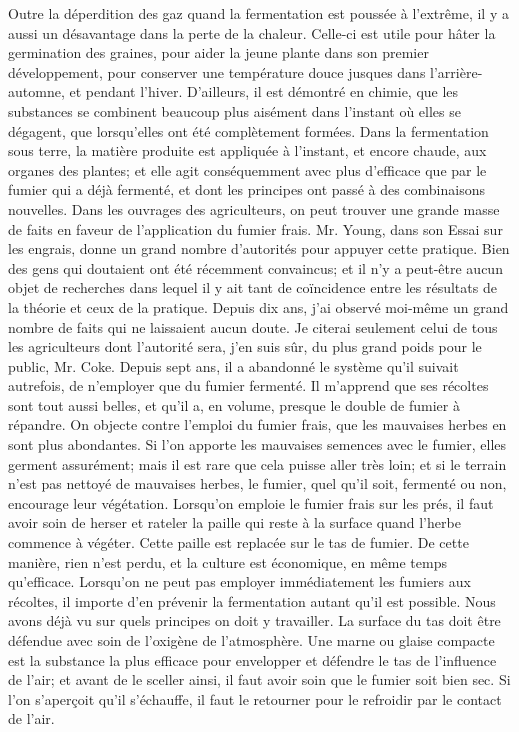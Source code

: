 Outre la déperdition des gaz quand la fermentation est poussée à l'extrême, il y a aussi un désavantage dans la perte de la chaleur. Celle-ci est utile pour hâter la germination des graines, pour aider la jeune plante dans son premier développement, pour conserver une température douce jusques dans l'arrière-automne, et pendant l'hiver.
D'ailleurs, il est démontré en chimie, que les substances se combinent beaucoup plus aisément dans l'instant où elles se dégagent, que lorsqu'elles ont été complètement formées. Dans la fermentation sous terre, la matière produite est appliquée à l'instant, et encore chaude, aux organes des plantes; et elle agit conséquemment avec plus d'efficace que par le fumier qui a déjà fermenté,\setcounter{page}{205} et dont les principes ont passé à des combinaisons nouvelles.
Dans les ouvrages des agriculteurs, on peut trouver une grande masse de faits en faveur de l'application du fumier frais. Mr. Young, dans son Essai sur les engrais, donne un grand nombre d'autorités pour appuyer cette pratique. Bien des gens qui doutaient ont été récemment convaincus; et il n'y a peut-être aucun objet de recherches dans lequel il y ait tant de coïncidence entre les résultats de la théorie et ceux de la pratique. Depuis dix ans, j'ai observé moi-même un grand nombre de faits qui ne laissaient aucun doute. Je citerai seulement celui de tous les agriculteurs dont l'autorité sera, j'en suis sûr, du plus grand poids pour le public, Mr. Coke. Depuis sept ans, il a abandonné le système qu'il suivait autrefois, de n'employer que du fumier fermenté. Il m'apprend que ses récoltes sont tout aussi belles, et qu'il a, en volume, presque le double de fumier à répandre.
On objecte contre l'emploi du fumier frais, que les mauvaises herbes en sont plus abondantes. Si l'on apporte les mauvaises semences avec le fumier, elles germent assurément; mais il est rare que cela puisse aller très loin; et si le terrain n'est pas nettoyé de\setcounter{page}{206} mauvaises herbes, le fumier, quel qu'il soit, fermenté ou non, encourage leur végétation. Lorsqu'on emploie le fumier frais sur les prés, il faut avoir soin de herser et rateler la paille qui reste à la surface quand l'herbe commence à végéter. Cette paille est replacée sur le tas de fumier. De cette manière, rien n'est perdu, et la culture est économique, en même temps qu'efficace.
Lorsqu'on ne peut pas employer immédiatement les fumiers aux récoltes, il importe d'en prévenir la fermentation autant qu'il est possible. Nous avons déjà vu sur quels principes on doit y travailler.
La surface du tas doit être défendue avec soin de l'oxigène de l'atmosphère. Une marne ou glaise compacte est la substance la plus efficace pour envelopper et défendre le tas de l'influence de l'air; et avant de le sceller ainsi, il faut avoir soin que le fumier soit bien sec. Si l'on s'aperçoit qu'il s'échauffe, il faut le retourner pour le refroidir par le contact de l'air.
